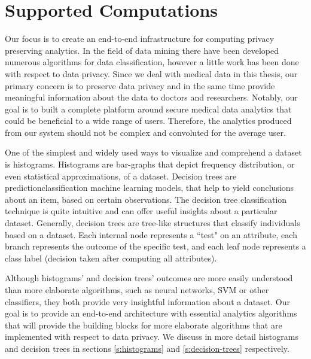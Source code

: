\section{Supported Computations}\label{s:computations}
Our focus is to create an end-to-end infrastructure for computing privacy preserving analytics.
In the field of data mining there have been developed numerous algorithms for data classification, however a little work has been done with respect to data privacy.
Since we deal with medical data in this thesis, our primary concern is to preserve data privacy and in the same time provide meaningful information about the data to doctors and researchers.
Notably, our goal is to built a complete platform around secure medical data analytics that could be beneficial to a wide range of users.
Therefore, the analytics produced from our system should not be complex and convoluted for the average user.

One of the simplest and widely used ways to visualize and comprehend a dataset is histograms.
Histograms are bar-graphs that depict frequency distribution, or even statistical approximations, of a dataset.
Decision trees are prediction\myslash classification machine learning models, that help to yield conclusions about an item, based on certain observations.
The decision tree classification technique is quite intuitive and can offer useful insights about a particular dataset. 
Generally, decision trees are tree-like structures that classify individuals based on a dataset.
Each internal node represents a ``test" on an attribute, each branch represents the outcome of the specific test, and each leaf node represents a class label (decision taken after computing all attributes).

Although histograms' and decision trees' outcomes are more easily understood than more elaborate algorithms, such as neural networks, SVM or other classifiers, they both provide very insightful information about a dataset.
Our goal is to provide an end-to-end architecture with essential analytics algorithms that will provide the building blocks for more elaborate algorithms that are implemented with respect to data privacy.
We discuss in more detail histograms and decision trees in sections \ref{s:histograms} and \ref{s:decision-trees} respectively.


